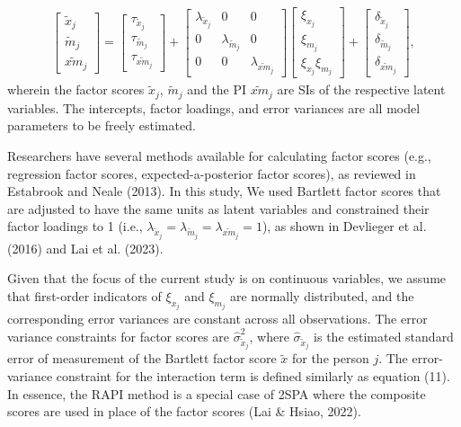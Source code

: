 \documentclass[
  man]{apa6}
\begin{document}
\begin{align}
    \begin{bmatrix}
        \tilde{x}_{j} \\ 
        \tilde{m}_{j} \\
        \widetilde{xm}_{j} 
    \end{bmatrix} = 
    \begin{bmatrix}
        \tau_{\tilde{x}_{j}} \\
        \tau_{\tilde{m}_{j}} \\ 
        \tau_{\widetilde{xm}_{j}}
    \end{bmatrix} + 
    \begin{bmatrix}
        \lambda_{\tilde{x}_{j}} & 0 & 0 \\
        0 & \lambda_{\tilde{m}_{j}} & 0 \\ 
        0 & 0 & \lambda_{\widetilde{xm}_{j}} 
    \end{bmatrix} 
    \begin{bmatrix}
        \xi_{x_{j}} \\  
        \xi_{m_{j}} \\
        \xi_{x_{j}}\xi_{m_{j}}
    \end{bmatrix} +
    \begin{bmatrix}
        \delta_{\tilde{x}_{j}} \\
        \delta_{\tilde{m}_{j}} \\ 
        \delta_{\widetilde{xm}_{j}}
    \end{bmatrix},
\end{align}
wherein the factor scores \(\tilde{x}_{j}\), \(\tilde{m}_{j}\) and the PI \(\widetilde{xm}_{j}\) are SIs of the respective latent variables. The intercepts, factor loadings, and error variances are all model parameters to be freely estimated.

Researchers have several methods available for calculating factor scores (e.g., regression factor scores, expected-a-posterior factor scores), as reviewed in Estabrook and Neale (2013). In this study, We used Bartlett factor scores that are adjusted to have the same units as latent variables and constrained their factor loadings to 1 (i.e., \(\lambda_{\tilde{x}_{j}} = \lambda_{\tilde{m}_{j}} = \lambda_{\widetilde{xm}_{j}} = 1\)), as shown in Devlieger et al. (2016) and Lai et al. (2023).

Given that the focus of the current study is on continuous variables, we assume that first-order indicators of \(\xi_{x_{j}}\) and \(\xi_{m_{j}}\) are normally distributed, and the corresponding error variances are constant across all observations. The error variance constraints for factor scores are \(\hat{\sigma}_{\tilde{x}_{j}}^2\), where \(\hat{\sigma}_{\tilde{x}_{j}}\) is the estimated standard error of measurement of the Bartlett factor score \(\tilde{x}\) for the person \(j\). The error-variance constraint for the interaction term is defined similarly as equation (11). In essence, the RAPI method is a special case of 2SPA where the composite scores are used in place of the factor scores (Lai \& Hsiao, 2022).
\end{document}
